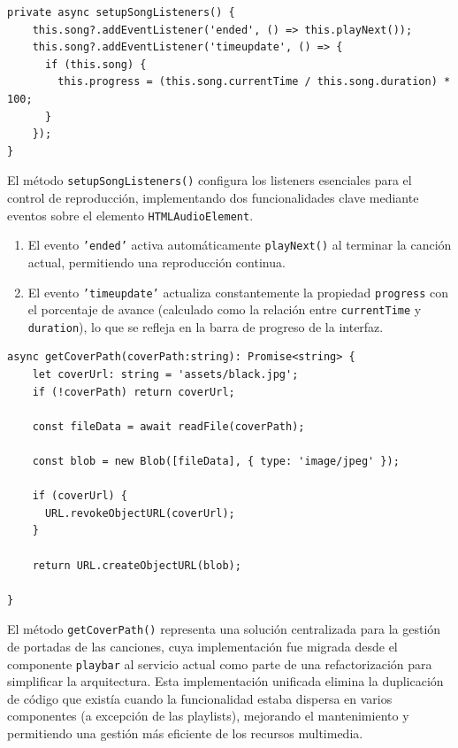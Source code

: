 \documentclass[11pt, a4paper]{article}
\begin{document}
                \begin{lstlisting}[caption={setUpSongListeners()}]
private async setupSongListeners() {
    this.song?.addEventListener('ended', () => this.playNext());
    this.song?.addEventListener('timeupdate', () => {
      if (this.song) {
        this.progress = (this.song.currentTime / this.song.duration) * 100;
      }
    });
}
                \end{lstlisting}

                El método \texttt{setupSongListeners()} configura los listeners esenciales para el control de reproducción, implementando dos funcionalidades clave mediante eventos sobre el elemento \texttt{HTMLAudioElement}.

                \begin{enumerate}
                  \item El evento \texttt{'ended'} activa automáticamente \texttt{playNext()} al terminar la canción actual, permitiendo una reproducción continua.
                  \item El evento \texttt{'timeupdate'} actualiza constantemente la propiedad \texttt{progress} con el porcentaje de avance (calculado como la relación entre \texttt{currentTime} y \texttt{duration}), lo que se refleja en la barra de progreso de la interfaz.
                \end{enumerate}

                \begin{lstlisting}[caption={getCoverPath()}]
async getCoverPath(coverPath:string): Promise<string> {
    let coverUrl: string = 'assets/black.jpg';
    if (!coverPath) return coverUrl;

    const fileData = await readFile(coverPath);
    
    const blob = new Blob([fileData], { type: 'image/jpeg' });

    if (coverUrl) {
      URL.revokeObjectURL(coverUrl);
    }

    return URL.createObjectURL(blob);

}
                \end{lstlisting}

                El método \texttt{getCoverPath()} representa una solución centralizada para la gestión de portadas de las canciones, cuya implementación fue migrada desde el componente \texttt{playbar} al servicio actual como parte de una refactorización para simplificar la arquitectura. Esta implementación unificada elimina la duplicación de código que existía cuando la funcionalidad estaba dispersa en varios componentes (a excepción de las playlists), mejorando el mantenimiento y permitiendo una gestión más eficiente de los recursos multimedia.
\end{document}
